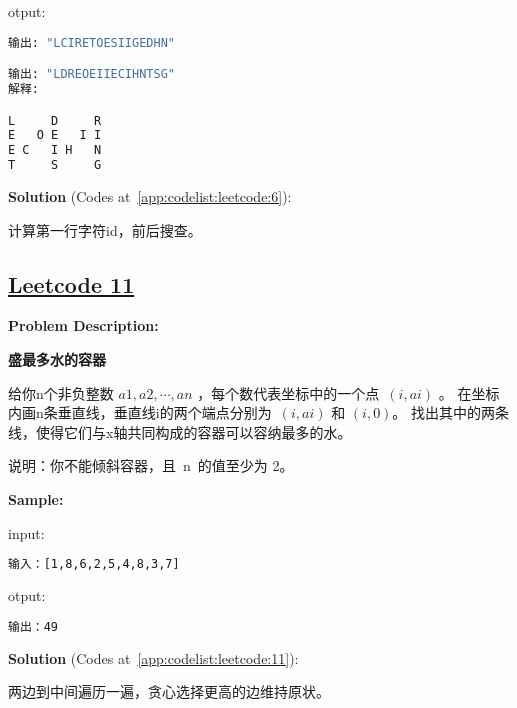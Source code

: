 otput:\par

\begin{lstlisting}[language=bash]
输出: "LCIRETOESIIGEDHN"

输出: "LDREOEIIECIHNTSG"
解释:

L     D     R
E   O E   I I
E C   I H   N
T     S     G
\end{lstlisting}

\textbf{Solution }(Codes at~\ref{app:codelist:leetcode:6}):\par

计算第一行字符id，前后搜查。\par



\subsection{\href{https://leetcode-cn.com/}{Leetcode 11}}\label{app:problemlist:leetcode:11}

\textbf{Problem Description:}\par

\textbf{盛最多水的容器}\par

给你n个非负整数 $ a1, a2, \cdots, an $ ，每个数代表坐标中的一个点 $ (i, ai) $ 。
在坐标内画n条垂直线，垂直线i的两个端点分别为 $ (i, ai) $ 和 $ (i, 0) $。
找出其中的两条线，使得它们与x轴共同构成的容器可以容纳最多的水。\par

说明：你不能倾斜容器，且 n 的值至少为 2。\par


\textbf{Sample:}\par

input:\par

\begin{lstlisting}[language=bash]
输入：[1,8,6,2,5,4,8,3,7]
\end{lstlisting}

otput:\par

\begin{lstlisting}[language=bash]
输出：49
\end{lstlisting}

\textbf{Solution }(Codes at~\ref{app:codelist:leetcode:11}):\par

两边到中间遍历一遍，贪心选择更高的边维持原状。\par



